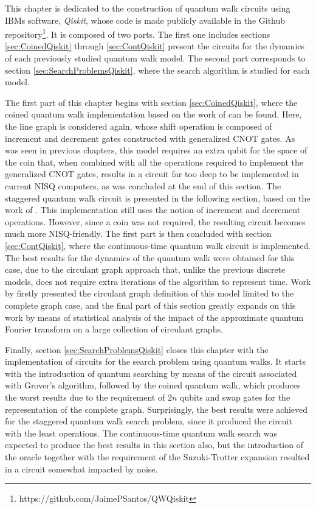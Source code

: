 \documentclass[../../dissertation.tex]{subfiles}
\begin{document}
This chapter is dedicated to the construction of quantum walk circuits using
IBMs software, \textit{Qiskit}, whose code is made publicly available in the Github
repository\footnote{https://github.com/JaimePSantos/QWQiskit}. It is composed
of two parts. The first one includes sections \ref{sec:CoinedQiskit} through \ref{sec:ContQiskit}
present the circuits for the dynamics of each previously studied quantum walk
model. The second part corresponds to section \ref{sec:SearchProblemsQiskit},
where the search algorithm is studied for each model.\par 

The first part of this chapter begins with section \ref{sec:CoinedQiskit},
where the coined quantum walk implementation based on the work of
\cite{douglaswang07} can be found. Here, the line graph is considered again,
whose shift operation is composed of increment and decrement gates constructed
with generalized CNOT gates. As was seen in previous chapters, this model
requires an extra qubit for the space of the coin that, when combined with all
the operations required to implement the generalized CNOT gates, results in a
circuit far too deep to be implemented in current NISQ computers, as was
concluded at the end of this section. The staggered quantum walk circuit is
presented in the following section, based on the work of
\cite{acasiete2020}. This implementation still uses the notion of increment
and decrement operations. However, since a coin was not required, the resulting
circuit becomes much more NISQ-friendly. The first part is then concluded with
section \ref{sec:ContQiskit}, where the continuous-time quantum walk circuit is
implemented. The best results for the dynamics of the quantum walk were
obtained for this case, due to the circulant graph approach that, unlike the previous
discrete models, does not require extra iterations of the algorithm to
represent time. Work by \cite{qiang2016} firstly presented the circulant graph
definition of this model limited to the complete graph case, and the final part
of this section greatly expands on this work by means of statistical analysis
of the impact of the approximate quantum Fourier transform on a large
collection of circulant graphs.\par

Finally, section \ref{sec:SearchProblemsQiskit} closes this chapter with the
implementation of circuits for the search problem using quantum walks. It starts with
the introduction of quantum searching by means of the circuit associated with
Grover's algorithm, followed by the coined quantum walk, which produces the
worst results due to the requirement of $2n$ qubits and swap gates for the
representation of the complete graph. Surprisingly, the best results were
achieved for the staggered quantum walk search problem, since it produced the
circuit with the least operations. The continuous-time quantum walk search was
expected to produce the best results in this section also, but the introduction
of the oracle together with the requirement of the Suzuki-Trotter expansion
resulted in a circuit somewhat impacted by noise.
\end{document}
